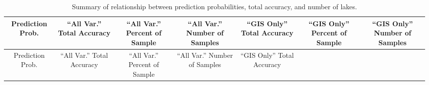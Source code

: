 \documentclass[12pt,]{article}
\begin{document}
\newpage

\begin{longtable}[c]{@{}ccccccc@{}}
\caption{Summary of relationship between prediction probabilities, total
accuracy, and number of lakes. \label{tab:cond_prob_tab}}\tabularnewline
\toprule
\begin{minipage}[b]{0.08\columnwidth}\centering\strut
Prediction Prob.
\strut\end{minipage} &
\begin{minipage}[b]{0.11\columnwidth}\centering\strut
``All Var.'' Total Accuracy
\strut\end{minipage} &
\begin{minipage}[b]{0.13\columnwidth}\centering\strut
``All Var.'' Percent of Sample
\strut\end{minipage} &
\begin{minipage}[b]{0.13\columnwidth}\centering\strut
``All Var.'' Number of Samples
\strut\end{minipage} &
\begin{minipage}[b]{0.11\columnwidth}\centering\strut
``GIS Only'' Total Accuracy
\strut\end{minipage} &
\begin{minipage}[b]{0.13\columnwidth}\centering\strut
``GIS Only'' Percent of Sample
\strut\end{minipage} &
\begin{minipage}[b]{0.13\columnwidth}\centering\strut
``GIS Only'' Number of Samples
\strut\end{minipage}\tabularnewline
\midrule
\endfirsthead
\toprule
\begin{minipage}[b]{0.08\columnwidth}\centering\strut
Prediction Prob.
\strut\end{minipage} &
\begin{minipage}[b]{0.11\columnwidth}\centering\strut
``All Var.'' Total Accuracy
\strut\end{minipage} &
\begin{minipage}[b]{0.13\columnwidth}\centering\strut
``All Var.'' Percent of Sample
\strut\end{minipage} &
\begin{minipage}[b]{0.13\columnwidth}\centering\strut
``All Var.'' Number of Samples
\strut\end{minipage} &
\begin{minipage}[b]{0.11\columnwidth}\centering\strut
``GIS Only'' Total Accuracy
\strut\end{minipage} &
\begin{minipage}[b]{0.13\columnwidth}\centering\strut

\end{minipage}
\end{longtable}
\end{document}
